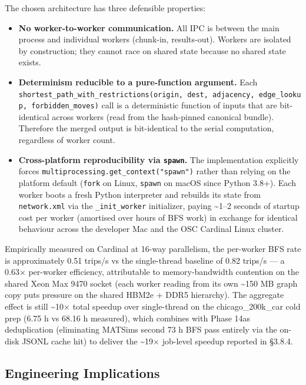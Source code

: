 The chosen architecture has three defensible properties:

\begin{itemize}
\tightlist
\item
  \textbf{No worker-to-worker communication.} All IPC is between the
  main process and individual workers (chunk-in, results-out). Workers
  are isolated by construction; they cannot race on shared state because
  no shared state exists.
\item
  \textbf{Determinism reducible to a pure-function argument.} Each
  \texttt{shortest\_path\_with\_restrictions(origin,\ dest,\ adjacency,\ edge\_lookup,\ forbidden\_moves)}
  call is a deterministic function of inputs that are bit-identical
  across workers (read from the hash-pinned canonical bundle). Therefore
  the merged output is bit-identical to the serial computation,
  regardless of worker count.
\item
  \textbf{Cross-platform reproducibility via \texttt{spawn}.} The
  implementation explicitly forces
  \texttt{multiprocessing.get\_context("spawn")} rather than relying on
  the platform default (\texttt{fork} on Linux, \texttt{spawn} on macOS
  since Python 3.8+). Each worker boots a fresh Python interpreter and
  rebuilds its state from \texttt{network.xml} via the
  \texttt{\_init\_worker} initializer, paying \textasciitilde1--2
  seconds of startup cost per worker (amortised over hours of BFS work)
  in exchange for identical behaviour across the developer Mac and the
  OSC Cardinal Linux cluster.
\end{itemize}

Empirically measured on Cardinal at 16-way parallelism, the per-worker
BFS rate is approximately 0.51 trips/s vs the single-thread baseline of
0.82 trips/s --- a 0.63× per-worker efficiency, attributable to
memory-bandwidth contention on the shared Xeon Max 9470 socket (each
worker reading from its own \textasciitilde150 MB graph copy puts
pressure on the shared HBM2e + DDR5 hierarchy). The aggregate effect is
still \textasciitilde10× total speedup over single-thread on the
chicago\_200k\_car cold prep (6.75 h vs 68.16 h measured), which
combines with Phase 14a\textquotesingle s deduplication (eliminating
MATSim\textquotesingle s second 73 h BFS pass entirely via the on-disk
JSONL cache hit) to deliver the \textasciitilde19× job-level speedup
reported in §3.8.4.

\subsection{Engineering
Implications}\label{386-engineering-implications}

